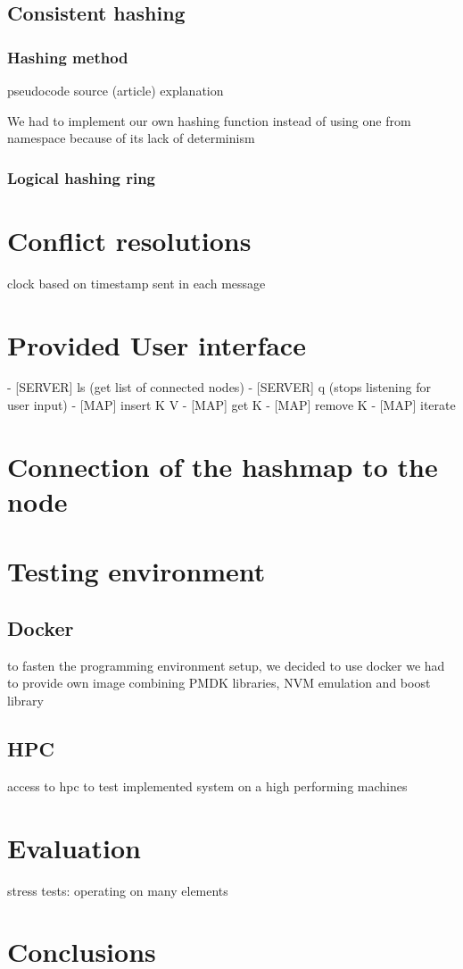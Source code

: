     \subsection{Consistent hashing}
        \subsubsection{Hashing method}
            pseudocode
            source (article)
            explanation
            
            We had to implement our own hashing function instead of using one from \std namespace because of its lack of determinism
            
        \subsubsection{Logical hashing ring}
            
\section{Conflict resolutions}
    clock based on timestamp sent in each message
    
\section{Provided User interface}  %
    - [SERVER] ls (get list of connected nodes)
    - [SERVER] q (stops listening for user input)
    - [MAP] insert K V
    - [MAP] get K
    - [MAP] remove K
    - [MAP] iterate

\section{Connection of the hashmap to the node}

\section{Testing environment}
    \subsection{Docker}
        to fasten the programming environment setup, we decided to use docker
        we had to provide own image combining PMDK libraries, NVM emulation and boost library

    \subsection{HPC}
        access to hpc to test implemented system on a high performing machines
    
\section{Evaluation}
    stress tests: operating on many elements

\section{Conclusions}

